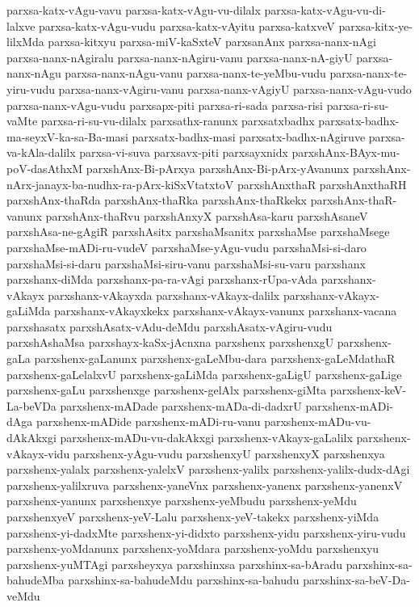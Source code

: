 {parxsa-katx-vAgu-vavu
parxsa-katx-vAgu-vu-dilalx
parxsa-katx-vAgu-vu-di-lalxve
parxsa-katx-vAgu-vudu
parxsa-katx-vAyitu
parxsa-katxveV
parxsa-kitx-ye-lilxMda
parxsa-kitxyu
parxsa-miV-kaSxteV
parxsanAnx
parxsa-nanx-nAgi
parxsa-nanx-nAgiralu
parxsa-nanx-nAgiru-vanu
parxsa-nanx-nA-giyU
parxsa-nanx-nAgu
parxsa-nanx-nAgu-vanu
parxsa-nanx-te-yeMbu-vudu
parxsa-nanx-te-yiru-vudu
parxsa-nanx-vAgiru-vanu
parxsa-nanx-vAgiyU
parxsa-nanx-vAgu-vudo
parxsa-nanx-vAgu-vudu
parxsapx-piti
parxsa-ri-sada
parxsa-risi
parxsa-ri-su-vaMte
parxsa-ri-su-vu-dilalx
parxsathx-ranunx
parxsatxbadhx
parxsatx-badhx-ma-seyxV-ka-sa-Ba-masi
parxsatx-badhx-masi
parxsatx-badhx-nAgiruve
parxsa-va-kAla-dalilx
parxsa-vi-suva
parxsavx-piti
parxsayxnidx
parxshAnx-BAyx-mu-poV-dasAthxM
parxshAnx-Bi-pArxya
parxshAnx-Bi-pArx-yAvanunx
parxshAnx-nArx-janayx-ba-nudhx-ra-pArx-kiSxVtatxtoV
parxshAnxthaR
parxshAnxthaRH
parxshAnx-thaRda
parxshAnx-thaRka
parxshAnx-thaRkekx
parxshAnx-thaR-vanunx
parxshAnx-thaRvu
parxshAnxyX
parxshAsa-karu
parxshAsaneV
parxshAsa-ne-gAgiR
parxshAsitx
parxshaMsanitx
parxshaMse
parxshaMsege
parxshaMse-mADi-ru-vudeV
parxshaMse-yAgu-vudu
parxshaMsi-si-daro
parxshaMsi-si-daru
parxshaMsi-siru-vanu
parxshaMsi-su-varu
parxshanx
parxshanx-diMda
parxshanx-pa-ra-vAgi
parxshanx-rUpa-vAda
parxshanx-vAkayx
parxshanx-vAkayxda
parxshanx-vAkayx-dalilx
parxshanx-vAkayx-gaLiMda
parxshanx-vAkayxkekx
parxshanx-vAkayx-vanunx
parxshanx-vacana
parxshasatx
parxshAsatx-vAdu-deMdu
parxshAsatx-vAgiru-vudu
parxshAshaMsa
parxshayx-kaSx-jAcnxna
parxshenx
parxshenxgU
parxshenx-gaLa
parxshenx-gaLanunx
parxshenx-gaLeMbu-dara
parxshenx-gaLeMdathaR
parxshenx-gaLelalxvU
parxshenx-gaLiMda
parxshenx-gaLigU
parxshenx-gaLige
parxshenx-gaLu
parxshenxge
parxshenx-gelAlx
parxshenx-giMta
parxshenx-keV-La-beVDa
parxshenx-mADade
parxshenx-mADa-di-dadxrU
parxshenx-mADi-dAga
parxshenx-mADide
parxshenx-mADi-ru-vanu
parxshenx-mADu-vu-dAkAkxgi
parxshenx-mADu-vu-dakAkxgi
parxshenx-vAkayx-gaLalilx
parxshenx-vAkayx-vidu
parxshenx-yAgu-vudu
parxshenxyU
parxshenxyX
parxshenxya
parxshenx-yalalx
parxshenx-yalelxV
parxshenx-yalilx
parxshenx-yalilx-dudx-dAgi
parxshenx-yalilxruva
parxshenx-yaneVnx
parxshenx-yanenx
parxshenx-yanenxV
parxshenx-yanunx
parxshenxye
parxshenx-yeMbudu
parxshenx-yeMdu
parxshenxyeV
parxshenx-yeV-Lalu
parxshenx-yeV-takekx
parxshenx-yiMda
parxshenx-yi-dadxMte
parxshenx-yi-didxto
parxshenx-yidu
parxshenx-yiru-vudu
parxshenx-yoMdanunx
parxshenx-yoMdara
parxshenx-yoMdu
parxshenxyu
parxshenx-yuMTAgi
parxsheyxya
parxshinxsa
parxshinx-sa-bAradu
parxshinx-sa-bahudeMba
parxshinx-sa-bahudeMdu
parxshinx-sa-bahudu
parxshinx-sa-beV-Da-veMdu
}
